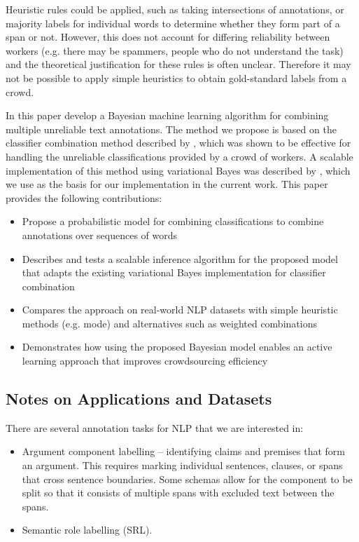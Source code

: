 Heuristic rules could be applied, such as taking intersections of annotations, or majority labels for individual words to determine whether they form part of a span or not. However, this does not account for differing reliability between workers (e.g. there may be spammers, people who do not understand the task) and the theoretical justification for these rules is often unclear. Therefore it may not be possible to apply simple heuristics to obtain gold-standard labels from a crowd. 

In this paper develop a Bayesian machine learning algorithm for combining multiple unreliable text annotations.
The method we propose is based on the classifier combination method described by \cite{kim2012bayesian}, 
which was shown to be effective for handling the unreliable classifications provided by a crowd of workers. A scalable implementation of this method using variational Bayes was described by \cite{simpsonlong}, which we use as the basis for our implementation in the current work. This paper provides the following contributions:
\begin{itemize}
  \item Propose a probabilistic model for combining classifications to combine annotations over sequences of words
  \item Describes and tests a scalable inference algorithm for the proposed model that adapts the existing variational Bayes implementation for classifier combination
  \item Compares the approach on real-world NLP datasets with simple heuristic methods (e.g. mode) and alternatives such as weighted combinations
  \item Demonstrates how using the proposed Bayesian model enables an active learning approach that improves crowdsourcing efficiency
\end{itemize}

\subsection{Notes on Applications and Datasets}

There are several annotation tasks for NLP that we are interested in:
\begin{itemize}
  \item Argument component labelling -- identifying claims and premises that form an argument. This requires marking individual sentences, clauses, or spans that cross sentence boundaries. Some schemas allow for the component to be split so that it consists of multiple spans with excluded text between the spans.
  \item Semantic role labelling (SRL).
\end{itemize}
